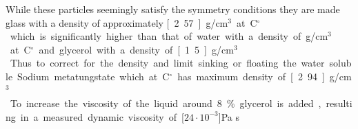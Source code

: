 While these particles seemingly satisfy the symmetry conditions they are made glass with a density of approximately \unit[2.57]{g/cm$^3$} at \unit[20]{C$^\circ$} which is significantly higher than that of water with a density of \unit[1]{g/cm$^3$} at \unit[20]{C$^\circ$} and glycerol with a density of \unit[1.5]{g/cm$^3$}. Thus to correct for the density and limit sinking or floating the water soluble Sodium metatungstate which at \unit[20]{C$^\circ$} has maximum density of \unit[2.94]{g/cm$^3$}. To increase the viscosity of the liquid around 8\% glycerol is added, resulting in a measured dynamic viscosity of \unit[$24\cdot 10^{-3}$]{Pa s}
